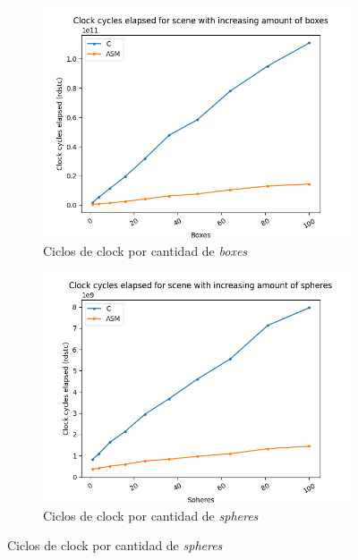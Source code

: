 \begin{figure}
    \centering
    \begin{subfigure}[b]{0.45\textwidth}
        \centering
        \includegraphics[width=\textwidth]{./imgs/exp3-box-c_vs_asm.png}
        \caption{Ciclos de clock por cantidad de \textit{boxes}}
    \end{subfigure}
    \hfill
    \begin{subfigure}[b]{0.45\textwidth}
        \centering
        \includegraphics[width=\textwidth]{./imgs/exp3-sphere-c_vs_asm.png}
        \caption{Ciclos de clock por cantidad de \textit{spheres}}
    \end{subfigure}


\end{figure}
